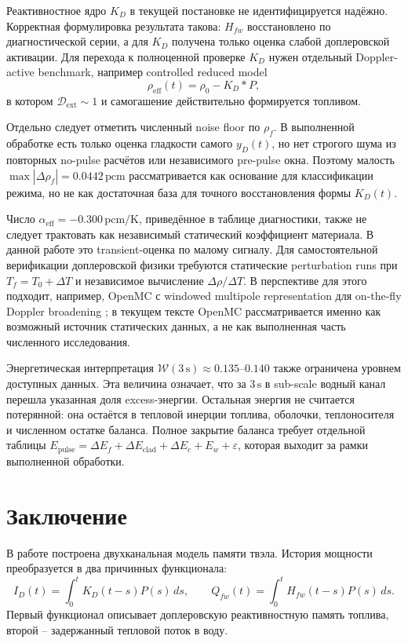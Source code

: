 \documentclass[12pt]{article}
\begin{document}
Реактивностное ядро \(K_D\) в текущей постановке не идентифицируется надёжно. Корректная формулировка результата такова: \(H_{fw}\) восстановлено по диагностической серии, а для \(K_D\) получена только оценка слабой доплеровской активации. Для перехода к полноценной проверке \(K_D\) нужен отдельный Doppler-active benchmark, например controlled reduced model
\[
\rho_{\mathrm{eff}}(t)=
\rho_0-K_D*P,
\]
в котором \(\mathcal D_{\mathrm{ext}}\sim1\) и самогашение действительно формируется топливом.

Отдельно следует отметить численный noise floor по \(\rho_f\). В выполненной обработке есть только оценка гладкости самого \(y_D(t)\), но нет строгого шума из повторных no-pulse расчётов или независимого pre-pulse окна. Поэтому малость \(\max|\Delta\rho_f|=0.0442\,\mathrm{pcm}\) рассматривается как основание для классификации режима, но не как достаточная база для точного восстановления формы \(K_D(t)\).

Число \(\alpha_{\mathrm{eff}}=-0.300\,\mathrm{pcm/K}\), приведённое в таблице диагностики, также не следует трактовать как независимый статический коэффициент материала. В данной работе это transient-оценка по малому сигналу. Для самостоятельной верификации доплеровской физики требуются статические perturbation runs при \(T_f=T_0+\Delta T\) и независимое вычисление \(\Delta\rho/\Delta T\). В перспективе для этого подходит, например, OpenMC с windowed multipole representation для on-the-fly Doppler broadening \cite{OpenMCCrossSections}; в текущем тексте OpenMC рассматривается именно как возможный источник статических данных, а не как выполненная часть численного исследования.

Энергетическая интерпретация \(\mathcal W(3\,\mathrm{s})\approx0.135\)--\(0.140\) также ограничена уровнем доступных данных. Эта величина означает, что за \(3\,\mathrm{s}\) в sub-scale водный канал перешла указанная доля excess-энергии. Остальная энергия не считается потерянной: она остаётся в тепловой инерции топлива, оболочки, теплоносителя и численном остатке баланса. Полное закрытие баланса требует отдельной таблицы \(E_{\mathrm{pulse}}=\Delta E_f+\Delta E_{\mathrm{clad}}+\Delta E_c+E_w+\varepsilon\), которая выходит за рамки выполненной обработки.

\section{Заключение}

В работе построена двухканальная модель памяти твэла. История мощности преобразуется в два причинных функционала:
\[
I_D(t)=\int_0^tK_D(t-s)P(s)\,ds,
\qquad
Q_{fw}(t)=\int_0^tH_{fw}(t-s)P(s)\,ds.
\]
Первый функционал описывает доплеровскую реактивностную память топлива, второй -- задержанный тепловой поток в воду.
\end{document}
